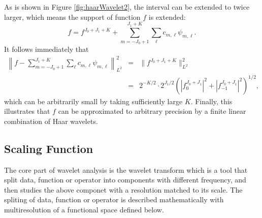 \documentclass{book}
\begin{document}
As is shown in Figure \ref{fig:haarWavelet2}, the interval can be extended to
twice larger, which means the support of function $f$ is extended:
\[ f = f^{J_0 + J_1 + K} + \sum_{m = - J_0 + 1}^{J_1 + K} \sum_{\ell} c_{m,
   \ell} \psi_{m, \ell} . \]
It follows immediately that
\begin{eqnarray*}
  \left\| f - \sum_{m = - J_0 + 1}^{J_1 + K} \sum_{\ell} c_{m, \ell} \psi_{m,
  \ell} \right\|_{L^2}^2 & = & \| f^{J_0 + J_1 + K} \|_{L^2}^2\\
  & = & 2^{- K / 2} \cdot 2^{J_1 / 2} (| f_0^{J_0 + J_1} |^2 + | f_{- 1}^{J_0
  + J_1} |^2)^{1 / 2},
\end{eqnarray*}
which can be arbitrarily small by taking sufficiently large $K$. Finally, this
illustrates that $f$ can be approximated to arbitrary precision by a finite
linear combination of Haar wavelets.

\subsection{Scaling Function}

The core part of wavelet analysis is the wavelet transform which is a tool
that split data, function or operator into components with different
frequency, and then studies the above componet with a resolution matched to
its scale{\cite{williams1994introduction,daubechies1992ten}}. The spliting of
data, function or operator is described mathematically with multiresolution of
a functional space defined below.
\end{document}
